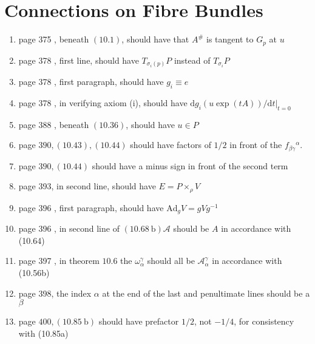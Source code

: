\documentclass{article}
\begin{document}
\section*{Connections on Fibre Bundles}

\begin{enumerate}
  
\item page 375 , beneath $(10.1)$, should have that $A^{\#}$ is tangent to $G_{p}$ at $u$

\item page 378 , first line, should have $T_{\sigma_{i}(p)} P$ instead of $T_{\sigma_{i}} P$

\item page 378 , first paragraph, should have $g_{i} \equiv e$

\item page 378 , in verifying axiom (i), should have $\mathrm{d} g_{i}(u \exp (t A)) /\left.\mathrm{d} t\right|_{t=0}$

\item page 388 , beneath $(10.36)$, should have $u \in P$

\item page $390,(10.43),(10.44)$ should have factors of $1 / 2$ in front of the $f_{\beta \gamma}{ }^{\alpha}$.

\item page $390,(10.44)$ should have a minus sign in front of the second term

\item page 393, in second line, should have $E=P \times_{\rho} V$

\item page 396 , first paragraph, should have $\mathrm{Ad}_{g} V=g V g^{-1}$

\item page 396 , in second line of $(10.68 \mathrm{~b}) \mathcal{A}$ should be $A$ in accordance with (10.64)

\item page 397 , in theorem $10.6$ the $\omega_{\alpha}^{\gamma}$ should all be $\mathcal{A}_{\alpha}^{\gamma}$ in accordance with (10.56b)

\item page 398, the index $\alpha$ at the end of the last and penultimate lines should be a $\beta$

\item page $400,(10.85 \mathrm{~b})$ should have prefactor $1 / 2$, not $-1 / 4$, for consistency with (10.85a)


\end{enumerate}
\end{document}
